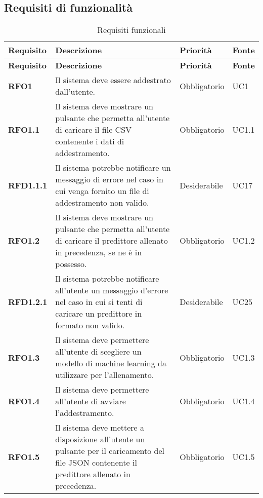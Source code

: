 \subsection{Requisiti di funzionalità}
\label{sub:requisiti_di_funzionalita}

\renewcommand{\arraystretch}{2} %
\begin{longtable}[H]{>{\centering\bfseries}m{2cm} >{\centering}m{9cm} >{\centering}m{2.5cm} >{\centering\arraybackslash}m{2.5cm}}
  \caption{Requisiti funzionali}%
  \label{tab:requisiti_funzionali}                                                    \\
  \rowcolor{lightgray}
  {\textbf{Requisito}} & {\textbf{Descrizione}} & {\textbf{Priorità}} & {\textbf{Fonte}}  \\
  \endfirsthead%
  \rowcolor{lightgray}
  {\textbf{Requisito}} & {\textbf{Descrizione}} & {\textbf{Priorità}} & {\textbf{Fonte}}  \\
  \endhead%
  \rowcolor{white}
  \multicolumn{4}{c}{\textit{Continua alla pagina successiva}}
  \endfoot%
  \endlastfoot%
  \textbf{RFO1} & Il sistema deve essere addestrato dall'utente. & Obbligatorio & UC1 \\
  \textbf{RFO1.1} & Il sistema deve mostrare un pulsante che permetta all'utente di caricare il file CSV contenente i dati di addestramento.  & Obbligatorio & UC1.1 \\
  \textbf{RFD1.1.1} & Il sistema potrebbe notificare un messaggio di errore nel caso in cui venga fornito un file di addestramento non valido. & Desiderabile & UC17 \\
  \textbf{RFO1.2} & Il sistema deve mostrare un pulsante che permetta all'utente di caricare il predittore allenato in precedenza, se ne è in possesso. & Obbligatorio & UC1.2 \\
  \textbf{RFD1.2.1} & Il sistema potrebbe notificare all'utente un messaggio d'errore nel caso in cui si tenti di caricare un predittore in formato non valido. & Desiderabile & UC25 \\
  \textbf{RFO1.3} & Il sistema deve permettere all'utente di scegliere un modello di machine learning da utilizzare per l'allenamento. & Obbligatorio & UC1.3 \\
  \textbf{RFO1.4} & Il sistema deve permettere all'utente di avviare l'addestramento. & Obbligatorio & UC1.4 \\
  \textbf{RFO1.5} & Il sistema deve mettere a disposizione all’utente un pulsante per il caricamento del file JSON contenente il predittore allenato in precedenza. & Obbligatorio & UC1.5 \\

\end{longtable}
